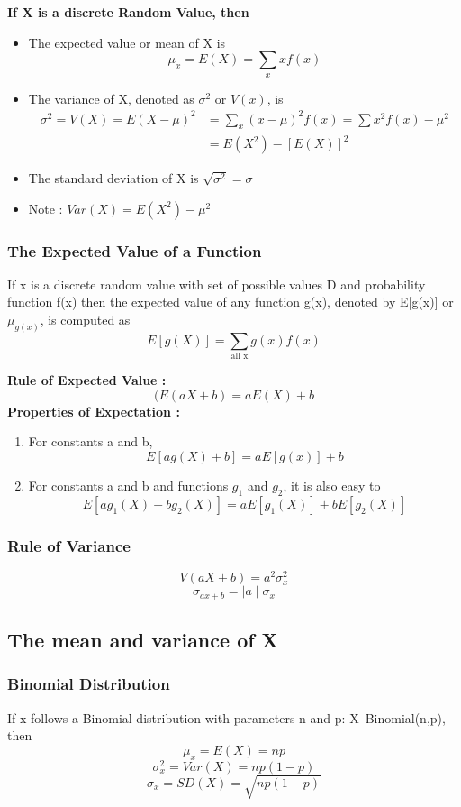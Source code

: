 \documentclass{article}
\begin{document}
\textbf{If X is a discrete Random Value, then}
\begin{itemize}
\item The expected value or mean of X is 
$$ \mu_x = E(X) = \sum_x x f(x)$$
\item The variance of X, denoted as \(\sigma^2\) or \(V(x)\), is 
$$\begin{aligned} \sigma^2 = V(X) = E(X - \mu)^2 & = \sum_x (x - \mu)^2 f(x) = \sum x^2 f(x) - \mu^2 \\ & = E(X^2) - [E(X)]^2 \end{aligned} $$
\item The standard deviation of X is \(\sqrt{\sigma^2} = \sigma\)
\item Note : \(Var(X) = E(X^2) - \mu^2\)
\end{itemize}

\subsubsection{The Expected Value of a Function}
If x is a discrete random value with set of possible values D and probability function f(x) then the expected value of any function g(x), denoted by E[g(x)] or \(\mu_{g(x)}\), is computed as
$$ E[g(X)] = \sum_{\text{all x}} g(x) f(x) $$

\textbf{Rule of Expected Value : } $$(E(a X + b) = aE(X) + b$$
\textbf{Properties of Expectation :}
\begin{enumerate}
\item For constants a and b, 
$$E[a g(X) + b] = a E[g(x)] + b$$
\item For constants a and b and functions \(g_1\) and \(g_2\), it is also easy to 
$$E[a g_1(X) + b g_2(X)] = a E[g_1(X)] + b E[g_2(X)]$$
\end{enumerate}

\subsubsection{Rule of Variance}
$$V(a X + b) = a^2 \sigma^2_x $$
$$\sigma_{ax+b} = \mid a \mid \sigma_x $$

\subsection{The mean and variance of X}
\subsubsection{Binomial Distribution}
If x follows a Binomial distribution with parameters n and p: X~Binomial(n,p), then 
$$ \mu_x = E(X) = np$$
$$ \sigma_x^2 = Var(X) = np(1 -p)$$
$$ \sigma_x = SD(X) = \sqrt{np(1-p)}$$
\end{document}
